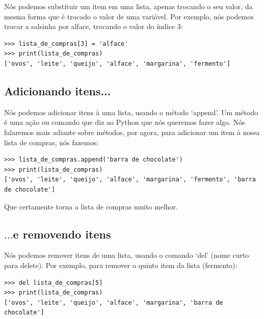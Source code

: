 Nós podemos substituir um item em uma lista, apenas trocando o seu valor, da mesma forma que é trocado o valor de uma variável. Por exemplo, nós podemos trocar a salsinha por alface, trocando o valor do índice 3:

\begin{listing}
\begin{verbatim}
>>> lista_de_compras[3] = 'alface'
>>> print(lista_de_compras)
['ovos', 'leite', 'queijo', 'alface', 'margarina', 'fermento']
\end{verbatim}
\end{listing}

\subsection*{\color{BrickRed}Adicionando itens...}

Nós podemos adicionar itens à uma lista, usando o método `append'. Um método é uma ação ou comando que diz ao Python que nós queremos fazer algo. Nós falaremos mais adiante sobre métodos, por agora, para adicionar um item à nossa lista de compras, nós fazemos:

\begin{listing}
\begin{verbatim}
>>> lista_de_compras.append('barra de chocolate')
>>> print(lista_de_compras)
['ovos', 'leite', 'queijo', 'alface', 'margarina', 'fermento', 'barra de chocolate']
\end{verbatim}
\end{listing}

Que certamente torna a lista de compras muito melhor.

\subsection*{\color{BrickRed}$\ldots$e removendo itens}

Nós podemos remover itens de uma lista, usando o comando `del' (nome curto para delete). Por exemplo, para remover o quinto item da lista (fermento):

\begin{listing}
\begin{verbatim}
>>> del lista_de_compras[5]
>>> print(lista_de_compras)
['ovos', 'leite', 'queijo', 'alface', 'margarina', 'barra de chocolate']
\end{verbatim}
\end{listing}

